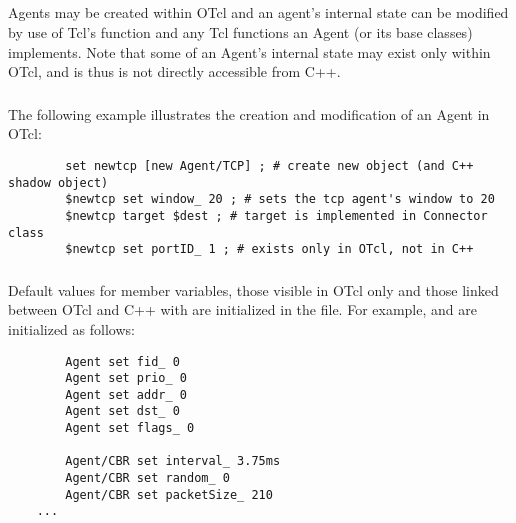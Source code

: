 \subsection{}

Agents may be created within OTcl and an agent's internal
state can be modified by use of Tcl's  function and
any Tcl functions an Agent (or its base classes) implements.
Note that some of an Agent's internal state may exist
only within OTcl, and is thus is not directly accessible from C++.

\subsubsection{}

The following example illustrates the creation and modification
of an Agent in OTcl:
\begin{small}
\begin{verbatim}
        set newtcp [new Agent/TCP] ; # create new object (and C++ shadow object)
        $newtcp set window_ 20 ; # sets the tcp agent's window to 20
        $newtcp target $dest ; # target is implemented in Connector class
        $newtcp set portID_ 1 ; # exists only in OTcl, not in C++
\end{verbatim}
\end{small}

\subsubsection{}

Default values for member variables, those visible in OTcl only and those
linked between OTcl and C++ with  are initialized
in the  file.  For example,
 and 
are initialized as follows:
\begin{small}
\begin{verbatim}
        Agent set fid_ 0
        Agent set prio_ 0
        Agent set addr_ 0
        Agent set dst_ 0
        Agent set flags_ 0

        Agent/CBR set interval_ 3.75ms
        Agent/CBR set random_ 0
        Agent/CBR set packetSize_ 210
	...
\end{verbatim}
\end{small}

